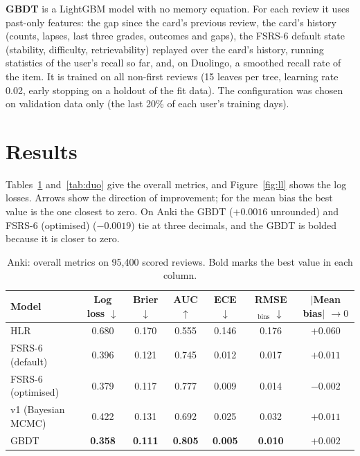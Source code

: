 \documentclass[11pt,a4paper]{article}
\begin{document}
\textbf{GBDT} is a LightGBM model with no memory equation. For each review it uses past-only features: the gap since the card's previous review, the card's history (counts, lapses, last three grades, outcomes and gaps), the
FSRS-6 default state (stability, difficulty, retrievability) replayed over the card's history, running statistics of the user's recall so far, and, on Duolingo, a smoothed recall rate of the item. It is trained on all
non-first reviews (15 leaves per tree, learning rate 0.02, early stopping on a holdout of the fit data). The configuration was chosen on validation data only (the last 20\% of each user's training days).

\section{Results}
Tables~\ref{tab:anki} and~\ref{tab:duo} give the overall metrics, and Figure~\ref{fig:ll} shows the log losses. Arrows show the direction of improvement; for the mean bias the best value is the one closest to zero. On Anki the GBDT ($+0.0016$ unrounded) and FSRS-6 (optimised) ($-0.0019$) tie at three decimals, and the GBDT is bolded because it is closer to zero.

\begin{table}[htbp]
  \centering
  \caption{Anki: overall metrics on 95,400 scored reviews. Bold marks the best value in each column.}
  \label{tab:anki}
  \small
  \begin{tabular}{@{}lcccccc@{}}
    \toprule
    Model & Log loss $\downarrow$ & Brier $\downarrow$ & AUC $\uparrow$ & ECE $\downarrow$ & RMSE$_{\mathrm{bins}}$ $\downarrow$ & $|$Mean bias$|$ $\to 0$ \\
    \midrule
    HLR & 0.680 & 0.170 & 0.555 & 0.146 & 0.176 & $+0.060$ \\
    FSRS-6 (default) & 0.396 & 0.121 & 0.745 & 0.012 & 0.017 & $+0.011$ \\
    FSRS-6 (optimised) & 0.379 & 0.117 & 0.777 & 0.009 & 0.014 & $-0.002$ \\
    v1 (Bayesian MCMC) & 0.422 & 0.131 & 0.692 & 0.025 & 0.032 & $+0.011$ \\
    GBDT & \textbf{0.358} & \textbf{0.111} & \textbf{0.805} & \textbf{0.005} & \textbf{0.010} & \textbf{$+0.002$} \\
    \bottomrule
  \end{tabular}
\end{table}
\end{document}

